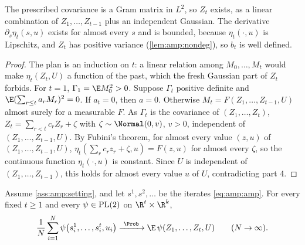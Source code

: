 \begin{refsection}

The prescribed covariance is a Gram matrix in $L^2$, so $Z_t$ exists, as a linear combination of $Z_1,\dots,Z_{t-1}$ plus an independent Gaussian. The derivative $\partial_s\eta_t(s,u)$ exists for almost every $s$ and is bounded, because $\eta_t(\cdot,u)$ is Lipschitz, and $Z_t$ has positive variance (\cref{lem:amp:nondeg}), so $b_t$ is well defined.


\begin{proof}
The plan is an induction on $t$: a linear relation among $M_0,\dots,M_t$ would make $\eta_t(Z_t,U)$ a function of the past, which the fresh Gaussian part of $Z_t$ forbids. For $t=1$, $\Gamma_1=\E M_0^2>0$. Suppose $\Gamma_t$ positive definite and $\E(\sum_{r\le t}a_rM_r)^2=0$. If $a_t=0$, then $a=0$. Otherwise $M_t=F(Z_1,\dots,Z_{t-1},U)$ almost surely for a measurable $F$. As $\Gamma_t$ is the covariance of $(Z_1,\dots,Z_t)$, $Z_t=\sum_{r<t}c_rZ_r+\zeta$ with $\zeta\sim\Normal(0,v)$, $v>0$, independent of $(Z_1,\dots,Z_{t-1},U)$. By Fubini's theorem, for almost every value $(z,u)$ of $(Z_1,\dots,Z_{t-1},U)$, $\eta_t(\sum_rc_rz_r+\zeta,u)=F(z,u)$ for almost every $\zeta$, so the continuous function $\eta_t(\cdot,u)$ is constant. Since $U$ is independent of $(Z_1,\dots,Z_{t-1})$, this holds for almost every value $u$ of $U$, contradicting part 4.
\end{proof}

\begin{theorem}\label{thm:amp:se}
Assume \cref{ass:amp:setting}, and let $s^1,s^2,\dots$ be the iterates \eqref{eq:amp:amp}. For every fixed $t\ge1$ and every $\psi\in\mathrm{PL}(2)$ on $\R^t\times\R^k$,
\[
\frac1N\sum_{i=1}^N\psi\bigl(s^1_i,\dots,s^t_i,u_i\bigr)\ampto\E\,\psi(Z_1,\dots,Z_t,U)\qquad(N\to\infty).
\]
\end{theorem}


\end{refsection}
